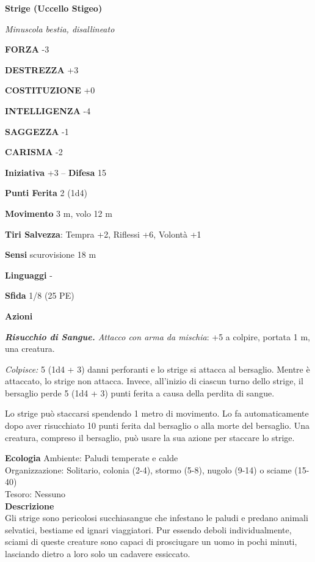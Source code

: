 \begin{multicols}{2}
\medskip{}\textbf{Strige (Uccello Stigeo)}

\emph{Minuscola bestia, disallineato}

\textbf{FORZA} -3

\textbf{DESTREZZA} +3

\textbf{COSTITUZIONE} +0

\textbf{INTELLIGENZA} -4

\textbf{SAGGEZZA} -1

\textbf{CARISMA} -2

\textbf{Iniziativa} +3 -- \textbf{Difesa} 15

\textbf{Punti Ferita} 2 (1d4)

\textbf{Movimento} 3 m, volo 12 m

\textbf{Tiri Salvezza}: Tempra +2, Riflessi +6, Volontà +1

\textbf{Sensi} scurovisione 18 m

\textbf{Linguaggi} -

\textbf{Sfida} 1/8 (25 PE)

\textbf{Azioni}

\emph{\textbf{Risucchio di Sangue.} Attacco con arma da mischia}: +5 a colpire, portata 1 m, una creatura.

\emph{Colpisce:} 5 (1d4 + 3) danni perforanti e lo strige si attacca al bersaglio. Mentre è attaccato, lo strige non attacca. Invece, all'inizio di ciascun turno dello strige, il bersaglio perde 5 (1d4 + 3) punti ferita a causa della perdita di sangue.

Lo strige può staccarsi spendendo 1 metro di movimento. Lo fa automaticamente dopo aver risucchiato 10 punti ferita dal bersaglio o alla morte del bersaglio. Una creatura, compreso il bersaglio, può usare la sua azione per staccare lo strige.

\textbf{Ecologia}
Ambiente: Paludi temperate e calde\\
Organizzazione: Solitario, colonia (2-4), stormo (5-8), nugolo (9-14) o sciame (15-40)\\
Tesoro: Nessuno\\
\textbf{Descrizione}\\
Gli strige sono pericolosi succhiasangue che infestano le paludi e predano animali selvatici, bestiame ed ignari viaggiatori. Pur essendo deboli individualmente, sciami di queste creature sono capaci di prosciugare un uomo in pochi minuti, lasciando dietro a loro solo un cadavere essiccato.\\


\end{multicols}
